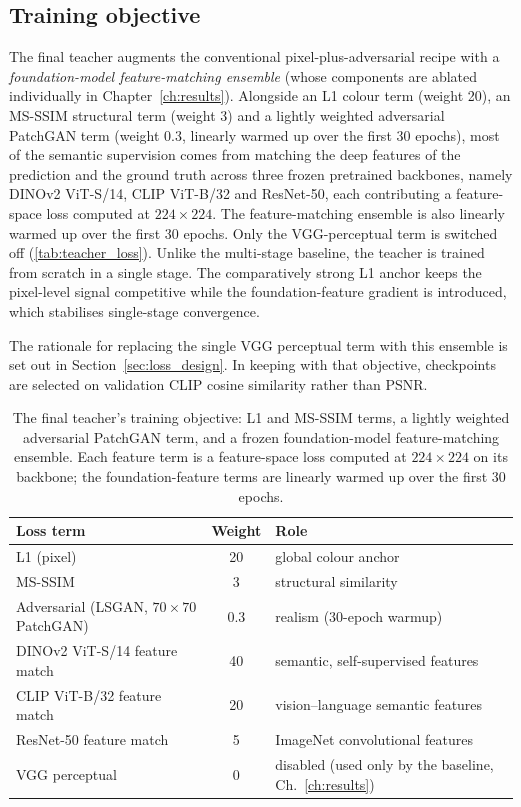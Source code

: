 \subsection{Training objective}
\label{sec:teacher_loss}

The final teacher augments the conventional pixel-plus-adversarial recipe with a \emph{foundation-model feature-matching ensemble} (whose components are ablated individually in Chapter~\ref{ch:results}). Alongside an L1 colour term (weight 20), an MS-SSIM structural term (weight 3) and a lightly weighted adversarial PatchGAN term (weight 0.3, linearly warmed up over the first 30 epochs), most of the semantic supervision comes from matching the deep features of the prediction and the ground truth across three frozen pretrained backbones, namely DINOv2 ViT-S/14, CLIP ViT-B/32 and ResNet-50, each contributing a feature-space loss computed at $224\times224$. The feature-matching ensemble is also linearly warmed up over the first 30 epochs. Only the VGG-perceptual term is switched off (\autoref{tab:teacher_loss}). Unlike the multi-stage baseline, the teacher is trained from scratch in a single stage. The comparatively strong L1 anchor keeps the pixel-level signal competitive while the foundation-feature gradient is introduced, which stabilises single-stage convergence.

The rationale for replacing the single VGG perceptual term with this ensemble is set out in Section~\ref{sec:loss_design}. In keeping with that objective, checkpoints are selected on validation CLIP cosine similarity rather than PSNR.

\begin{table}[!htbp]
\centering
\footnotesize
\begin{tabular}{lcl}
\hline
\textbf{Loss term} & \textbf{Weight} & \textbf{Role} \\
\hline
L1 (pixel) & 20 & global colour anchor \\
MS-SSIM & 3 & structural similarity \\
Adversarial (LSGAN, $70\times70$ PatchGAN) & 0.3 & realism (30-epoch warmup) \\
DINOv2 ViT-S/14 feature match & 40 & semantic, self-supervised features \\
CLIP ViT-B/32 feature match & 20 & vision--language semantic features \\
ResNet-50 feature match & 5 & ImageNet convolutional features \\
VGG perceptual & 0 & disabled (used only by the baseline, Ch.~\ref{ch:results}) \\
\hline
\end{tabular}
\caption{The final teacher's training objective: L1 and MS-SSIM terms, a lightly weighted adversarial PatchGAN term, and a frozen foundation-model feature-matching ensemble. Each feature term is a feature-space loss computed at $224\times224$ on its backbone; the foundation-feature terms are linearly warmed up over the first 30 epochs.}
\label{tab:teacher_loss}
\end{table}

